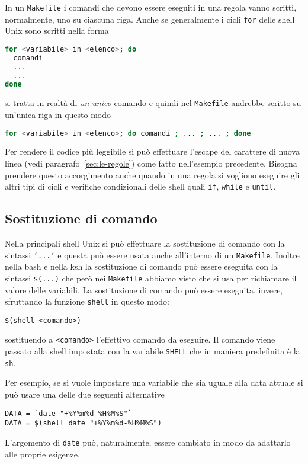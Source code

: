 In un \texttt{Makefile} i comandi che devono essere eseguiti in una regola vanno
scritti, normalmente, uno su ciascuna riga.  Anche se generalmente i cicli
\texttt{for} delle shell Unix sono scritti nella forma
\begin{lstlisting}[language=bash]
for <variabile> in <elenco>; do
  comandi
  ...
  ...
done
\end{lstlisting}
si tratta in realtà di \emph{un unico} comando e quindi nel \texttt{Makefile}
andrebbe scritto su un'unica riga in questo modo
\begin{lstlisting}[language=bash]
for <variabile> in <elenco>; do comandi ; ... ; ... ; done
\end{lstlisting}
Per rendere il codice più leggibile si può effettuare l'escape del carattere di
nuova linea (vedi paragrafo~\ref{sec:le-regole}) come fatto nell'esempio
precedente.  Bisogna prendere questo accorgimento anche quando in una regola si
vogliono eseguire gli altri tipi di cicli e verifiche condizionali delle shell
quali \texttt{if}, \texttt{while} e \texttt{until}.

\subsection{Sostituzione di comando}
\label{sec:sostituzione-comando}

Nella principali shell Unix si può effettuare la sostituzione di comando con la
sintassi \texttt{`...`} e questa può essere usata anche all'interno di un
\texttt{Makefile}.  Inoltre nella bash e nella ksh la sostituzione di comando
può essere eseguita con la sintassi \texttt{\$(...)} che però nei
\texttt{Makefile} abbiamo visto che si usa per richiamare il valore delle
variabili.  La sostituzione di comando può essere eseguita, invece, sfruttando
la funzione \texttt{shell} in questo modo:
\begin{lstlisting}
$(shell <comando>)
\end{lstlisting} %
sostituendo a \texttt{<comando>} l'effettivo comando da eseguire.  Il comando
viene passato alla shell impostata con la variabile \texttt{SHELL} che in
maniera predefinita è la \texttt{sh}.

Per esempio, se si vuole impostare una variabile che sia uguale alla data
attuale si può usare una delle due seguenti alternative
\begin{lstlisting}
DATA = `date "+%Y%m%d-%H%M%S"`
DATA = $(shell date "+%Y%m%d-%H%M%S")
\end{lstlisting} %
L'argomento di \texttt{date} può, naturalmente, essere cambiato in modo da
adattarlo alle proprie esigenze.

